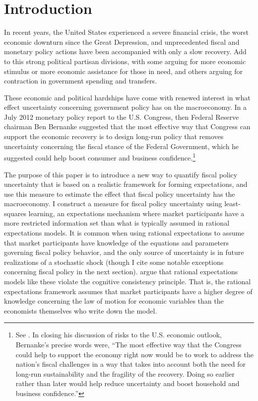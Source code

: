 \documentclass[11pt]{article}
\newcommand{\citee}[1]{\citet{#1}}
\begin{document}
\newpage

\section{Introduction}

In recent years, the United States experienced a severe financial crisis, the worst economic downturn since the Great Depression, and unprecedented fiscal and monetary policy actions have been accompanied with only a slow recovery.  Add to this strong political partisan divisions, with some arguing for more economic stimulus or more economic assistance for those in need, and others arguing for contraction in government spending and transfers. 

These economic and political hardships have come with renewed interest in what effect uncertainty concerning government policy has on the macroeconomy.  In a July 2012 monetary policy report to the U.S. Congress, then Federal Reserve chairman Ben Bernanke suggested that the most effective way that Congress can support the economic recovery is to design long-run policy that removes uncertainty concerning the fiscal stance of the Federal Government, which he suggested could help boost consumer and business confidence.\footnote{See \citee{bernanke2012}.  In closing his discussion of risks to the U.S. economic outlook, Bernanke's precise words were, ``The most effective way that the Congress could help to support the economy right now would be to work to address the nation's fiscal challenges in a way that takes into account both the need for long-run sustainability and the fragility of the recovery. Doing so earlier rather than later would help reduce uncertainty and boost household and business confidence.''}  

The purpose of this paper is to introduce a new way to quantify fiscal policy uncertainty that is based on a realistic framework for forming expectations, and use this measure to estimate the effect that fiscal policy uncertainty has the macroeconomy.  I construct a measure for fiscal policy uncertainty using least-squares learning, an expectations mechanism where market participants have a more restricted information set than what is typically assumed in rational expectations models.  It is common when using rational expectations to assume that market participants have knowledge of the equations and parameters governing fiscal policy behavior, and the only source of uncertainty is in future realizations of a stochastic shock (though I cite some notable exceptions concerning fiscal policy in the next section).  \citee{eh2011} argue that rational expectations models like these violate the cognitive consistency principle.  That is, the rational expectations framework assumes that market participants have a higher degree of knowledge concerning the law of motion for economic variables than the economists themselves who write down the model.  
\end{document}

